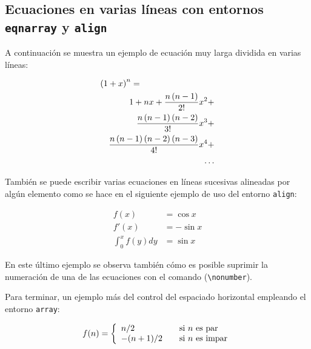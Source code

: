 \subsection{Ecuaciones en varias líneas con entornos \texttt{eqnarray} y \texttt{align}}
A continuación se muestra un ejemplo de ecuación muy larga dividida en varias líneas:

\begin{eqnarray*}
  \lefteqn{\left(1+x\right)^n = } \\
  & & 1 + nx + \frac{n\left(n-1\right)}{2!}x^2 + \\
  & & \frac{n\left(n-1\right)\left(n-2\right)}{3!}x^3 + \\
  & & \frac{n\left(n-1\right)\left(n-2\right)\left(n-3\right)}{4!}x^4 + \\
  & & \ldots
\end{eqnarray*}

También se puede escribir varias ecuaciones en líneas sucesivas alineadas por algún elemento como se hace en el siguiente ejemplo de uso del entorno \texttt{align}:

\begin{align}
f(x) & = \cos x \\
f'(x) & = -\sin x \\
\int_{0}^{x} f(y)dy & = \sin x \nonumber
\end{align}

\noindent En este último ejemplo se observa también cómo es posible suprimir la numeración de una de las ecuaciones con el comando (\texttt{\textbackslash nonumber}).

Para terminar, un ejemplo más del control del espaciado horizontal empleando el entorno \texttt{array}:

\[f(n) = \left\{ 
\begin{array}{l l}
  n/2 & \quad \mbox{si $n$ es par}\\
  -(n+1)/2 & \quad \mbox{si $n$ es impar}\\ \end{array} \right. \]


